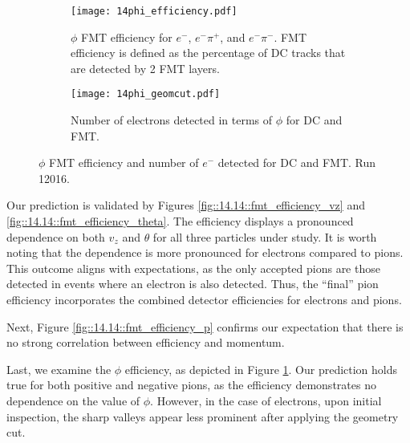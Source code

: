     \begin{figure}
        \begin{subfigure}[b]{\textwidth}
            \texttt{[image: 14phi\_efficiency.pdf]}
            \caption{$\phi$ FMT efficiency for $e^-$, $e^-\pi^+$, and $e^-\pi^-$.
            FMT efficiency is defined as the percentage of DC tracks that are detected by 2 FMT layers.}
            \label{fig::14.14::fmt_efficiency_phi}
        \end{subfigure}
        \begin{subfigure}[b]{\textwidth}
            \texttt{[image: 14phi\_geomcut.pdf]}
            \caption{Number of electrons detected in terms of $\phi$ for DC and FMT.}
            \label{fig::14.14::phi_geomcut}
        \end{subfigure}

        \caption[$\phi$ efficiency and geometry cut study]
        {$\phi$ FMT efficiency and number of $e^-$ detected for DC and FMT.
        Run 12016.}
        \label{fig::14.14::phi_study}
    \end{figure}

    Our prediction is validated by Figures \ref{fig::14.14::fmt_efficiency_vz} and \ref{fig::14.14::fmt_efficiency_theta}.
    The efficiency displays a pronounced dependence on both $v_z$ and $\theta$ for all three particles under study.
    It is worth noting that the dependence is more pronounced for electrons compared to pions.
    This outcome aligns with expectations, as the only accepted pions are those detected in events where an electron is also detected.
    Thus, the ``final'' pion efficiency incorporates the combined detector efficiencies for electrons and pions.

    Next, Figure \ref{fig::14.14::fmt_efficiency_p} confirms our expectation that there is no strong correlation between efficiency and momentum.

    Last, we examine the $\phi$ efficiency, as depicted in Figure \ref{fig::14.14::fmt_efficiency_phi}.
    Our prediction holds true for both positive and negative pions, as the efficiency demonstrates no dependence on the value of $\phi$.
    However, in the case of electrons, upon initial inspection, the sharp valleys appear less prominent after applying the geometry cut.

